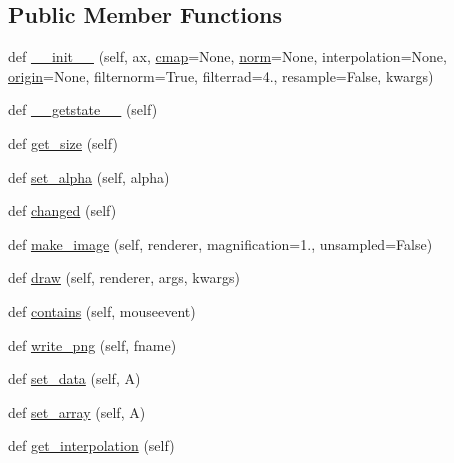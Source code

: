 \subsection*{Public Member Functions}
\begin{DoxyCompactItemize}
\item 
def \hyperlink{classmatplotlib_1_1image_1_1__ImageBase_a2cc198019d3aa6a9327753b13c0d6d6f}{\+\_\+\+\_\+init\+\_\+\+\_\+} (self, ax, \hyperlink{classmatplotlib_1_1cm_1_1ScalarMappable_a3684ebc12a81cc6f2599c0babd1d40af}{cmap}=None, \hyperlink{classmatplotlib_1_1cm_1_1ScalarMappable_a5507985e8c38feaa3d6972f75db09f73}{norm}=None, interpolation=None, \hyperlink{classmatplotlib_1_1image_1_1__ImageBase_aebc786349e152a9dc981ffde5bc39795}{origin}=None, filternorm=True, filterrad=4., resample=False, kwargs)
\item 
def \hyperlink{classmatplotlib_1_1image_1_1__ImageBase_a2bfcf35419e62730e3258f4137fcd31c}{\+\_\+\+\_\+getstate\+\_\+\+\_\+} (self)
\item 
def \hyperlink{classmatplotlib_1_1image_1_1__ImageBase_acc571a855419ea9bc9c83574a2f7dbed}{get\+\_\+size} (self)
\item 
def \hyperlink{classmatplotlib_1_1image_1_1__ImageBase_a280c36871506b1dbbb02473195e7c036}{set\+\_\+alpha} (self, alpha)
\item 
def \hyperlink{classmatplotlib_1_1image_1_1__ImageBase_a2298f70c89e3548f96a694616a355b9b}{changed} (self)
\item 
def \hyperlink{classmatplotlib_1_1image_1_1__ImageBase_a151f8eb95487c68ca5d410c6cf1187c2}{make\+\_\+image} (self, renderer, magnification=1., unsampled=False)
\item 
def \hyperlink{classmatplotlib_1_1image_1_1__ImageBase_aa4af506a938c83cdb74986f9df93611d}{draw} (self, renderer, args, kwargs)
\item 
def \hyperlink{classmatplotlib_1_1image_1_1__ImageBase_a34173e76d12b5ecd5835f328436bc461}{contains} (self, mouseevent)
\item 
def \hyperlink{classmatplotlib_1_1image_1_1__ImageBase_ab8bd120a4b02492b35821d6ef958286b}{write\+\_\+png} (self, fname)
\item 
def \hyperlink{classmatplotlib_1_1image_1_1__ImageBase_a6300e9bfe249af97fc7a8df11086e03d}{set\+\_\+data} (self, A)
\item 
def \hyperlink{classmatplotlib_1_1image_1_1__ImageBase_a72eb246b58a230e18e8eeef1fee6d7b8}{set\+\_\+array} (self, A)
\item 
def \hyperlink{classmatplotlib_1_1image_1_1__ImageBase_aca58d66eb933a7b1f2ad0ff6960fbe30}{get\+\_\+interpolation} (self)

\end{DoxyCompactItemize}
